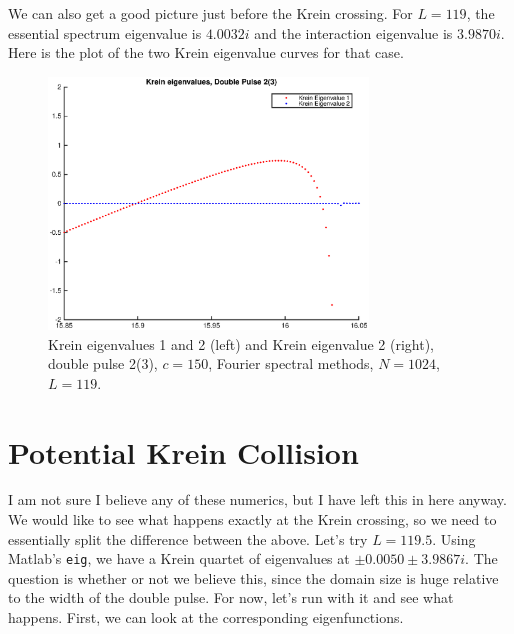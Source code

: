\documentclass[12pt]{article}
\begin{document}
We can also get a good picture just before the Krein crossing. For $L = 119$, the essential spectrum eigenvalue is $4.0032i$ and the interaction eigenvalue is $3.9870i$. Here is the plot of the two Krein eigenvalue curves for that case.

\begin{figure}[H]
	\includegraphics[width=8.5cm]{1500F_dp2_119_krein1.eps}
	\caption{Krein eigenvalues 1 and 2 (left) and Krein eigenvalue 2 (right), double pulse 2(3), $c = 150$, Fourier spectral methods, $N = 1024$, $L = 119$. }
\end{figure}

\section*{Potential Krein Collision}

I am not sure I believe any of these numerics, but I have left this in here anyway.\\

We would like to see what happens exactly at the Krein crossing, so we need to essentially split the difference between the above. Let's try $L = 119.5$. Using Matlab's \texttt{eig}, we have a Krein quartet of eigenvalues at $\pm0.0050 \pm 3.9867i$. The question is whether or not we believe this, since the domain size is huge relative to the width of the double pulse. For now, let's run with it and see what happens. First, we can look at the corresponding eigenfunctions. 
\end{document}

